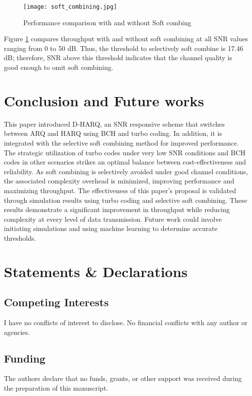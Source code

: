 \documentclass[sn-mathphys-num]{sn-jnl}
\theoremstyle{thmstyleone}
\theoremstyle{thmstyletwo}%
\theoremstyle{thmstylethree}%
\begin{document}
\begin{figure}[H]
    \centering
    \texttt{[image: soft\_combining.jpg]}
    \caption{Performance comparison with and without Soft combing}
    \label{fig:9}
\end{figure}

Figure \ref{fig:9} compares throughput with and without soft combining at all SNR values ranging from 0 to 50 dB. Thus, the threshold to selectively soft combine is 17.46 dB; therefore, SNR above this threshold indicates that the channel quality is good enough to omit soft combining.

\section{Conclusion and Future works} \label{s5}

This paper introduced D-HARQ, an SNR responsive scheme that switches between ARQ and HARQ using BCH and turbo coding. In addition, it is integrated with the selective soft combining method for improved performance. The strategic utilization of turbo codes under very low SNR conditions and BCH codes in other scenarios strikes an optimal balance between cost-effectiveness and reliability. As soft combining is selectively avoided under good channel conditions, the associated complexity overhead is minimized, improving performance and maximizing throughput. The effectiveness of this paper's proposal is validated through simulation results using turbo coding and selective soft combining. These results demonstrate a significant improvement in throughput while reducing complexity at every level of data transmission. Future work could involve initiating simulations and using machine learning to determine accurate thresholds.

\section*{\textbf{Statements \& Declarations}}

\subsection*{Competing Interests}
I have no conflicts of interest to disclose. No financial conflicts with any author
or agencies.

\subsection*{Funding}
The authors declare that no funds, grants, or other support was received during the preparation of this manuscript.
\end{document}
